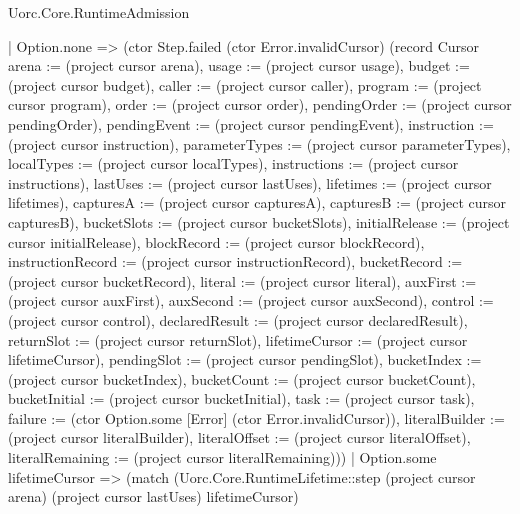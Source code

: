 \begin{lexlean}{Uorc.Core.RuntimeAdmission}
\begin{semanticmodule}
{        | Option.none => (ctor Step.failed (ctor Error.invalidCursor) (record Cursor {arena := (project cursor arena), usage := (project cursor usage), budget := (project cursor budget), caller := (project cursor caller), program := (project cursor program), order := (project cursor order), pendingOrder := (project cursor pendingOrder), pendingEvent := (project cursor pendingEvent), instruction := (project cursor instruction), parameterTypes := (project cursor parameterTypes), localTypes := (project cursor localTypes), instructions := (project cursor instructions), lastUses := (project cursor lastUses), lifetimes := (project cursor lifetimes), capturesA := (project cursor capturesA), capturesB := (project cursor capturesB), bucketSlots := (project cursor bucketSlots), initialRelease := (project cursor initialRelease), blockRecord := (project cursor blockRecord), instructionRecord := (project cursor instructionRecord), bucketRecord := (project cursor bucketRecord), literal := (project cursor literal), auxFirst := (project cursor auxFirst), auxSecond := (project cursor auxSecond), control := (project cursor control), declaredResult := (project cursor declaredResult), returnSlot := (project cursor returnSlot), lifetimeCursor := (project cursor lifetimeCursor), pendingSlot := (project cursor pendingSlot), bucketIndex := (project cursor bucketIndex), bucketCount := (project cursor bucketCount), bucketInitial := (project cursor bucketInitial), task := (project cursor task), failure := (ctor Option.some [Error] (ctor Error.invalidCursor)), literalBuilder := (project cursor literalBuilder), literalOffset := (project cursor literalOffset), literalRemaining := (project cursor literalRemaining)}))
        | Option.some lifetimeCursor => (match (Uorc.Core.RuntimeLifetime::step (project cursor arena) (project cursor lastUses) lifetimeCursor)
}
\end{semanticmodule}
\end{lexlean}
